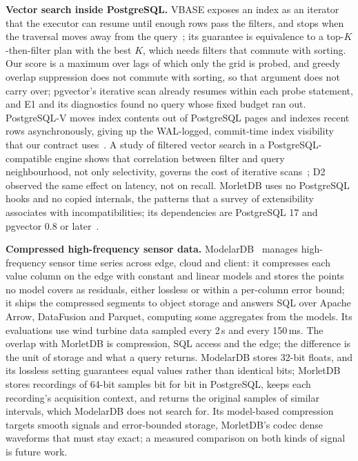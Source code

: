 \documentclass[sigconf]{acmart}
\newcommand{\M}{MorletDB}
\begin{document}
\textbf{Vector search inside PostgreSQL.} VBASE exposes an index as an iterator that the executor can resume until enough rows pass the filters, and stops when the traversal moves away from the query~\cite{vbase}; its guarantee is equivalence to a top-$K$-then-filter plan with the best $K$, which needs filters that commute with sorting. Our score is a maximum over lags of which only the grid is probed, and greedy overlap suppression does not commute with sorting, so that argument does not carry over; pgvector's iterative scan already resumes within each probe statement, and E1 and its diagnostics found no query whose fixed budget ran out. PostgreSQL-V moves index contents out of PostgreSQL pages and indexes recent rows asynchronously, giving up the WAL-logged, commit-time index visibility that our contract uses~\cite{pgvdecoupled}. A study of filtered vector search in a PostgreSQL-compatible engine shows that correlation between filter and query neighbourhood, not only selectivity, governs the cost of iterative scans~\cite{filterstudy}; D2 observed the same effect on latency, not on recall. MorletDB uses no PostgreSQL hooks and no copied internals, the patterns that a survey of extensibility associates with incompatibilities; its dependencies are PostgreSQL 17 and pgvector 0.8 or later~\cite{anarchy}.

\textbf{Compressed high-frequency sensor data.} ModelarDB~\cite{modelardb25,modelardb24} manages high-frequency sensor time series across edge, cloud and client: it compresses each value column on the edge with constant and linear models and stores the points no model covers as residuals, either lossless or within a per-column error bound; it ships the compressed segments to object storage and answers SQL over Apache Arrow, DataFusion and Parquet, computing some aggregates from the models. Its evaluations use wind turbine data sampled every 2\,s and every 150\,ms. The overlap with \M{} is compression, SQL access and the edge; the difference is the unit of storage and what a query returns. ModelarDB stores 32-bit floats, and its lossless setting guarantees equal values rather than identical bits; \M{} stores recordings of 64-bit samples bit for bit in PostgreSQL, keeps each recording's acquisition context, and returns the original samples of similar intervals, which ModelarDB does not search for. Its model-based compression targets smooth signals and error-bounded storage, \M{}'s codec dense waveforms that must stay exact; a measured comparison on both kinds of signal is future work.
\end{document}
